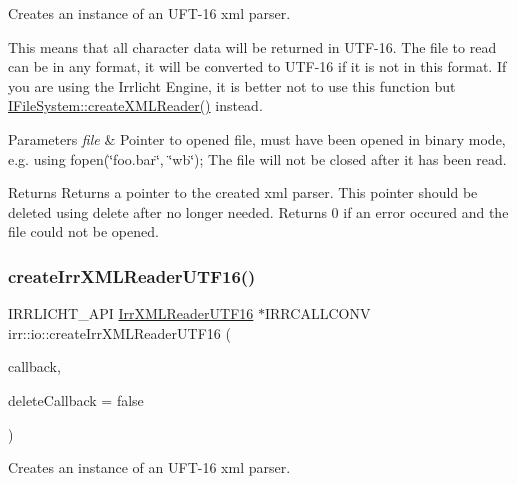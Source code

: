 Creates an instance of an U\+F\+T-\/16 xml parser. 

This means that all character data will be returned in U\+T\+F-\/16. The file to read can be in any format, it will be converted to U\+T\+F-\/16 if it is not in this format. If you are using the Irrlicht Engine, it is better not to use this function but \hyperlink{classirr_1_1io_1_1IFileSystem_a167c9fa159d16ee5c56c074636b0865e}{I\+File\+System\+::create\+X\+M\+L\+Reader()} instead. 
\begin{DoxyParams}{Parameters}
{\em file} & Pointer to opened file, must have been opened in binary mode, e.\+g. using fopen(\char`\"{}foo.\+bar\char`\"{}, \char`\"{}wb\char`\"{}); The file will not be closed after it has been read. \\
\hline
\end{DoxyParams}
\begin{DoxyReturn}{Returns}
Returns a pointer to the created xml parser. This pointer should be deleted using \textquotesingle{}delete\textquotesingle{} after no longer needed. Returns 0 if an error occured and the file could not be opened. 
\end{DoxyReturn}
\mbox{\label{namespaceirr_1_1io_acb1ed419a0327adcf0da1a779d553efa}} 
\subsubsection{\texorpdfstring{create\+Irr\+X\+M\+L\+Reader\+U\+T\+F16()}{createIrrXMLReaderUTF16()}\hspace{0.1cm}{\footnotesize\ttfamily [3/3]}}
{\footnotesize\ttfamily I\+R\+R\+L\+I\+C\+H\+T\+\_\+\+A\+PI \hyperlink{namespaceirr_1_1io_a76b498bd6edceb2e2ef91d75585e6bfd}{Irr\+X\+M\+L\+Reader\+U\+T\+F16} $\ast$I\+R\+R\+C\+A\+L\+L\+C\+O\+NV irr\+::io\+::create\+Irr\+X\+M\+L\+Reader\+U\+T\+F16 (\begin{DoxyParamCaption}\item[{\hyperlink{classirr_1_1io_1_1IFileReadCallBack}{I\+File\+Read\+Call\+Back} $\ast$}]{callback,  }\item[{bool}]{delete\+Callback = {\ttfamily false} }\end{DoxyParamCaption})}



Creates an instance of an U\+F\+T-\/16 xml parser. 

